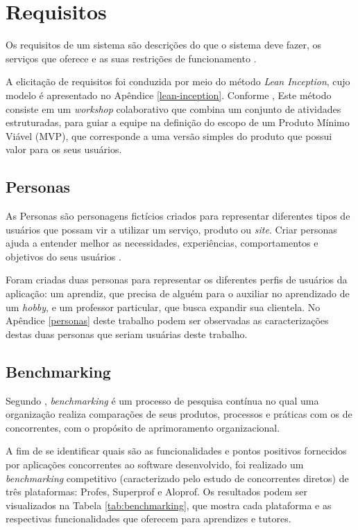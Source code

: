 \section[Requisitos]{Requisitos}
\label{requisitos}

Os requisitos de um sistema são descrições do que o sistema deve fazer, os serviços que oferece e as suas restrições de funcionamento \cite{sommerville2011engenharia}.

A elicitação de requisitos foi conduzida por meio do método \textit{Lean Inception}, cujo modelo é apresentado no Apêndice \ref{lean-inception}. Conforme , Este método consiste em um \textit{workshop} colaborativo que combina um conjunto de atividades estruturadas, para guiar a equipe na definição do escopo de um Produto Mínimo Viável (MVP), que corresponde a uma versão simples do produto que possui valor para os seus usuários.

\subsection[Personas]{Personas}

As Personas são personagens fictícios criados para representar diferentes tipos de usuários que possam vir a utilizar um serviço, produto ou \textit{site}. Criar personas ajuda a entender melhor as necessidades, experiências, comportamentos e objetivos do seus usuários \cite{dam2025personas}.

Foram criadas duas personas para representar os diferentes perfis de usuários da aplicação: um aprendiz, que precisa de alguém para o auxiliar no aprendizado de um \textit{hobby}, e um professor particular, que busca expandir sua clientela. No Apêndice \ref{personas} deste trabalho podem ser observadas as caracterizações destas duas personas que seriam usuárias deste trabalho. 

\subsection[Benchmarking]{Benchmarking}

Segundo , \textit{benchmarking} é um processo de pesquisa contínua no qual uma organização realiza comparações de seus produtos, processos e práticas com os de concorrentes, com o propósito de aprimoramento organizacional.

A fim de se identificar quais são as funcionalidades e pontos positivos fornecidos por aplicações concorrentes ao software desenvolvido, foi realizado um \textit{benchmarking} competitivo (caracterizado pelo estudo de concorrentes diretos) de três plataformas: Profes, Superprof e Aloprof. Os resultados podem ser visualizados na Tabela \ref{tab:benchmarking}, que mostra cada plataforma e as respectivas funcionalidades que oferecem para aprendizes e tutores.

